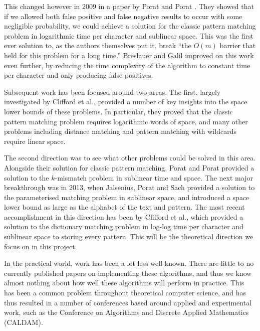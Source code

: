 \documentclass[a4paper,11pt]{article}
\begin{document}
    This changed however in 2009 in a paper by Porat and Porat \cite{5438620}. They showed that if we allowed both false positive and false negative results to occur with some negligible probability, we could achieve a solution for the classic pattern matching problem in logarithmic time per character and sublinear space. This was the first ever solution to, as the authors themselves put it, break ``the $O(m)$ barrier that held for this problem for a long time.'' Breslauer and Galil \cite{Breslauer:2014:RSS:2660854.2635814} improved on this work even further, by reducing the time complexity of the algorithm to constant time per character and only producing false positives.

    Subsequent work has been focused around two areas. The first, largely investigated by Clifford et al.\@ \cite{DBLP:journals/corr/abs-1106-4412}, provided a number of key insights into the space lower bounds of these problems. In particular, they proved that the classic pattern matching problem requires logarithmic words of space, and many other problems including distance matching and pattern matching with wildcards require linear space.

    The second direction was to see what other problems could be solved in this area. Alongside their solution for classic pattern matching, Porat and Porat \cite{5438620} provided a solution to the $k$-mismatch problem in sublinear time and space. The next major breakthrough was in 2013, when Jalsenius, Porat and Sach \cite{JPS:2013} provided a solution to the parameterised matching problem in sublinear space, and introduced a space lower bound as large as the alphabet of the text and pattern. The most recent accomplishment in this direction has been by Clifford et al.\@ \cite{2015arXiv150406242C}, which provided a solution to the dictionary matching problem in log-log time per character and sublinear space to storing every pattern. This will be the theoretical direction we focus on in this project.

    In the practical world, work has been a lot less well-known. There are little to no currently published papers on implementing these algorithms, and thus we know almost nothing about how well these algorithms will perform in practice. This has been a common problem throughout theoretical computer science, and has thus resulted in a number of conferences based around applied and experimental work, such as the Conference on Algorithms and Discrete Applied Mathematics (CALDAM).
\end{document}
